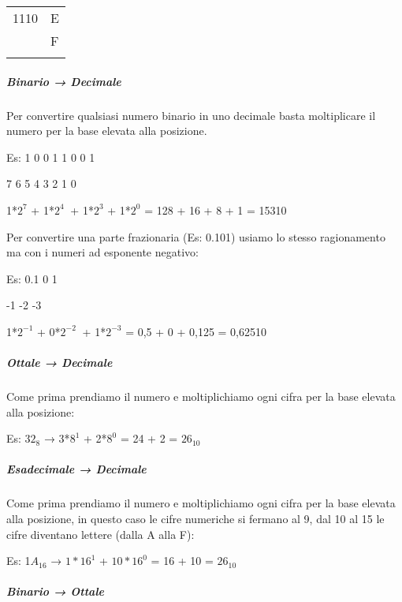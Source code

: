 \begin{longtable}[]{@{}
  >{\raggedright\arraybackslash}p{}
  >{\raggedright\arraybackslash}p{}@{}}
\begin{minipage}[b]{\linewidth}
1110
\end{minipage} & \begin{minipage}[b]{\linewidth}\centering
E
\end{minipage} \\
\begin{minipage}[b]{\linewidth}\centering
1111
\end{minipage} & \begin{minipage}[b]{\linewidth}\centering
F
\end{minipage} \\
\midrule\noalign{}
\endhead
\bottomrule\noalign{}
\endlastfoot
\end{longtable}

\subparagraph{\texorpdfstring{\emph{Binario →
Decimale}}{Binario → Decimale}}\label{binario-decimale}

Per convertire qualsiasi numero binario in uno decimale basta
moltiplicare il numero per la base elevata alla posizione.

Es: 1 0 0 1 1 0 0 1

7 6 5 4 3 2 1 0

1*\(2^{7}\) + 1*\(2^{4}\ \) + 1*\(2^{3}\) + 1*\(2^{0}\) = 128 + 16 + 8 +
1 = 15310

Per convertire una parte frazionaria (Es: 0.101) usiamo lo stesso
ragionamento ma con i numeri ad esponente negativo:

Es: 0.1 0 1

-1 -2 -3

1*\(2^{- 1}\) + 0*\(2^{- 2}\ \) + 1*\(2^{- 3}\) = 0,5 + 0 + 0,125 =
0,62510

\subparagraph{\texorpdfstring{\emph{Ottale →
Decimale}}{Ottale → Decimale}}\label{ottale-decimale}

Come prima prendiamo il numero e moltiplichiamo ogni cifra per la base
elevata alla posizione:

Es: \(32_{8}\) → 3*\(8^{1}\) + 2*\(8^{0}\) = 24 + 2 = \(26_{10}\)

\subparagraph{\texorpdfstring{\emph{Esadecimale →
Decimale}}{Esadecimale → Decimale}}\label{esadecimale-decimale}

Come prima prendiamo il numero e moltiplichiamo ogni cifra per la base
elevata alla posizione, in questo caso le cifre numeriche si fermano al
9, dal 10 al 15 le cifre diventano lettere (dalla A alla F):

Es: 1\(A_{16}\) → \(1*16^{1}\) + \(10*16^{0}\) = 16 + 10 = \(26_{10}\)

\subparagraph{\texorpdfstring{\emph{Binario →
Ottale}}{Binario → Ottale}}\label{binario-ottale}


